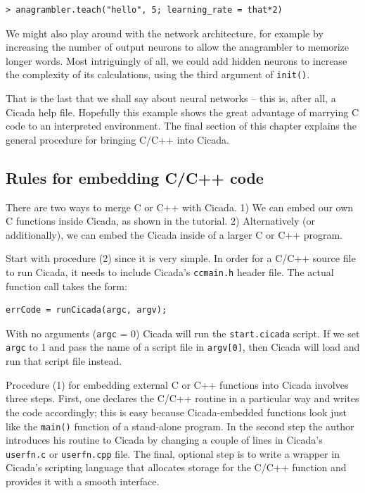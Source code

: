 \documentclass{article}
\newenvironment{code}{
       \begin{list}{}{
               \setlength{\leftmargin}{.4in}
               \setlength{\rightmargin}{0in}
               \setlength{\topsep}{.2in}
       }
       \small
       \item[] }
       { \end{list}   }
\begin{document}
\begin{code} \begin{verbatim}
> anagrambler.teach("hello", 5; learning_rate = that*2)
\end{verbatim} \end{code}

\noindent We might also play around with the network architecture, for example by increasing the number of output neurons to allow the anagrambler to memorize longer words.  Most intriguingly of all, we could add hidden neurons to increase the complexity of its calculations, using the third argument of \verb#init()#.

That is the last that we shall say about neural networks -- this is, after all, a Cicada help file.  Hopefully this example shows the great advantage of marrying C code to an interpreted environment.  The final section of this chapter explains the general procedure for bringing C/C++ into Cicada.




\subsection{Rules for embedding C/C++ code}

There are two ways to merge C or C++ with Cicada.  1) We can embed our own C functions inside Cicada, as shown in the tutorial.  2) Alternatively (or additionally), we can embed the Cicada inside of a larger C or C++ program.

Start with procedure (2) since it is very simple.  In order for a C/C++ source file to run Cicada, it needs to include Cicada's \verb#ccmain.h# header file.  The actual function call takes the form:

\begin{code} \begin{verbatim}
errCode = runCicada(argc, argv);
\end{verbatim} \end{code}

\noindent With no arguments (\verb#argc# = 0) Cicada will run the \verb#start.cicada# script.  If we set \verb#argc# to 1 and pass the name of a script file in \verb#argv[0]#, then Cicada will load and run that script file instead.

Procedure (1) for embedding external C or C++ functions into Cicada involves three steps.  First, one declares the C/C++ routine in a particular way and writes the code accordingly; this is easy because Cicada-embedded functions look just like the \verb#main()# function of a stand-alone program.  In the second step the author introduces his routine to Cicada by changing a couple of lines in Cicada's \verb#userfn.c# or \verb#userfn.cpp# file.  The final, optional step is to write a wrapper in Cicada's scripting language that allocates storage for the C/C++ function and provides it with a smooth interface.
\end{document}
